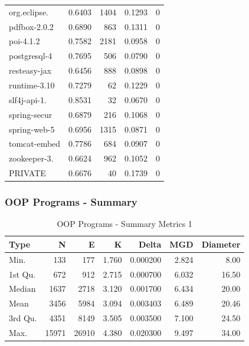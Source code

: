 \documentclass[12pt, a4paper]{article}
\begin{document}
\begin{longtable}[H]{l r r r r}
        org.eclipse. &  0.6403 &  1404 &  0.1293 & 0 \\  
        pdfbox-2.0.2 &  0.6890 &   863 &  0.1311 & 0 \\  
        poi-4.1.2    &  0.7582 &  2181 &  0.0958 & 0 \\  
        postgresql-4 &  0.7695 &   506 &  0.0790 & 0 \\  
        resteasy-jax &  0.6456 &   888 &  0.0898 & 0 \\  
        runtime-3.10 &  0.7279 &    62 &  0.1229 & 0 \\  
        slf4j-api-1. &  0.8531 &    32 &  0.0670 & 0 \\  
        spring-secur &  0.6879 &   216 &  0.1068 & 0 \\  
        spring-web-5 &  0.6956 &  1315 &  0.0871 & 0 \\  
        tomcat-embed &  0.7786 &   684 &  0.0907 & 0 \\  
        zookeeper-3. &  0.6624 &   962 &  0.1052 & 0 \\  
        PRIVATE      &  0.6676 &    40 &  0.1739 & 0  
\end{longtable}

\subsubsection{OOP Programs - Summary}
\begin{longtable}[H]{l r r r r r r}
    \caption{OOP Programs - Summary Metrics 1}\label{table:oop_sum_metrics_1}\\
        Type & N & E & K & Delta & MGD & Diameter\\
        \hline            
        \endhead
        Min.    &   133 &   177 & 1.760 & 0.000200 & 2.824 &  8.00\\  
        1st Qu. &   672 &   912 & 2.715 & 0.000700 & 6.032 & 16.50\\  
        Median  &  1637 &  2718 & 3.120 & 0.001700 & 6.434 & 20.00\\  
        Mean    &  3456 &  5984 & 3.094 & 0.003403 & 6.489 & 20.46\\  
        3rd Qu. &  4351 &  8149 & 3.505 & 0.003500 & 7.100 & 24.50\\  
        Max.    & 15971 & 26910 & 4.380 & 0.020300 & 9.497 & 34.00  
\end{longtable}
\end{document}
